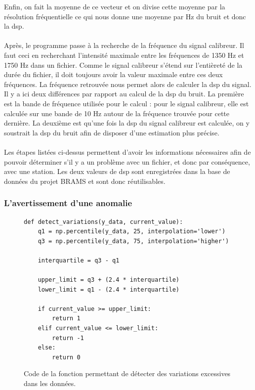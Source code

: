 \documentclass[11pt]{article}
\begin{document}
Enfin, on fait la moyenne de ce vecteur et on divise cette moyenne par la résolution fréquentielle ce qui nous donne une moyenne par Hz du bruit et donc la dsp.\\
\\
Après, le programme passe à la recherche de la fréquence du signal calibreur.
Il faut ceci en recherchant l'intensité maximale entre les fréquences de 1350 Hz et 1750 Hz dans un fichier.
Comme le signal calibreur s'étend sur l'entièreté de la durée du fichier, il doit toujours avoir la valeur maximale entre ces deux fréquences.
La fréquence retrouvée nous permet alors de calculer la dsp du signal.
Il y a ici deux différences par rapport au calcul de la dsp du bruit.
La première est la bande de fréquence utilisée pour le calcul : pour le signal calibreur, elle est calculée sur une bande de 10 Hz autour de la fréquence trouvée pour cette dernière.
La deuxième est qu'une fois la dsp du signal calibreur est calculée, on y soustrait la dsp du bruit afin de disposer d'une estimation plus précise.\\
\\
Les étapes listées ci-dessus permettent d'avoir les informations nécessaires afin de pouvoir déterminer s'il y a un problème avec un fichier, et donc par conséquence, avec une station.
Les deux valeurs de dsp sont enregistrées dans la base de données du projet BRAMS et sont donc réutilisables.

\subsubsection{L'avertissement d'une anomalie}

\begin{figure}
    \begin{lstlisting}[style=CStyle]
def detect_variations(y_data, current_value):
    q1 = np.percentile(y_data, 25, interpolation='lower')
    q3 = np.percentile(y_data, 75, interpolation='higher')

    interquartile = q3 - q1

    upper_limit = q3 + (2.4 * interquartile)
    lower_limit = q1 - (2.4 * interquartile)

    if current_value >= upper_limit:
        return 1
    elif current_value <= lower_limit:
        return -1
    else:
        return 0
    \end{lstlisting}
    \caption{Code de la fonction permettant de détecter des variations excessives dans les données.}
    \label{fig:detection-code}
\end{figure}
\end{document}
